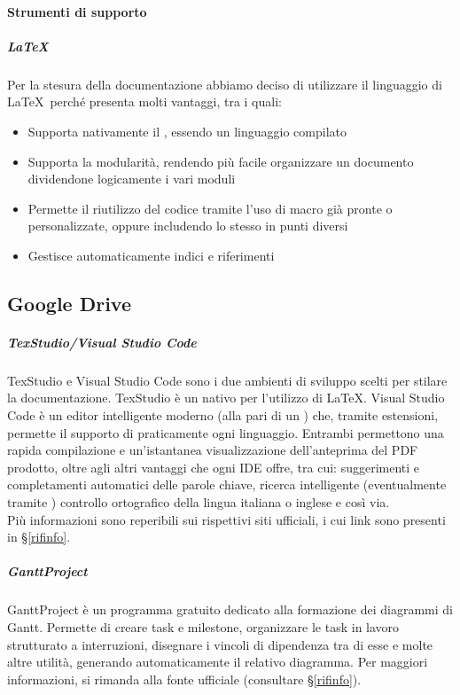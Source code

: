 			\paragraph{Strumenti di supporto}

			\subparagraph{\LaTeX} \label{LaTeX}
			Per la stesura della documentazione abbiamo deciso di utilizzare il linguaggio di  \LaTeX\ perché presenta molti vantaggi, tra i quali:
			\begin{itemize}
				\item Supporta nativamente il , essendo un linguaggio compilato
				\item Supporta la modularità, rendendo più facile organizzare un documento dividendone logicamente i vari moduli
				\item Permette il riutilizzo del codice tramite l'uso di macro già pronte o personalizzate, oppure includendo lo stesso  in punti diversi
				\item Gestisce automaticamente indici e riferimenti
			\end{itemize}

			\subsection{Google Drive}

			\subparagraph{TexStudio/Visual Studio Code}
			TexStudio e Visual Studio Code sono i due ambienti di sviluppo scelti per stilare la documentazione.
			TexStudio è un  nativo per l'utilizzo di \LaTeX. Visual Studio Code è un editor intelligente moderno (alla pari di un ) che, tramite
			estensioni, permette il supporto di praticamente ogni linguaggio.
			Entrambi permettono una rapida compilazione e un'istantanea visualizzazione dell'anteprima del PDF prodotto, oltre agli altri vantaggi che ogni IDE offre,
			tra cui: suggerimenti e completamenti automatici delle parole chiave, ricerca intelligente (eventualmente tramite ) controllo ortografico della
			lingua italiana o inglese e così via.\\
			Più informazioni sono reperibili sui rispettivi siti ufficiali, i cui link sono presenti in \S\ref{rifinfo}.

			\subparagraph{GanttProject}
			GanttProject è un programma gratuito dedicato alla formazione dei diagrammi di Gantt. Permette di creare task e milestone, organizzare le task in lavoro
			strutturato a interruzioni, disegnare i vincoli di dipendenza tra di esse e molte altre utilità, generando automaticamente il relativo diagramma.
			Per maggiori informazioni, si rimanda alla fonte ufficiale (consultare \S\ref{rifinfo}).

